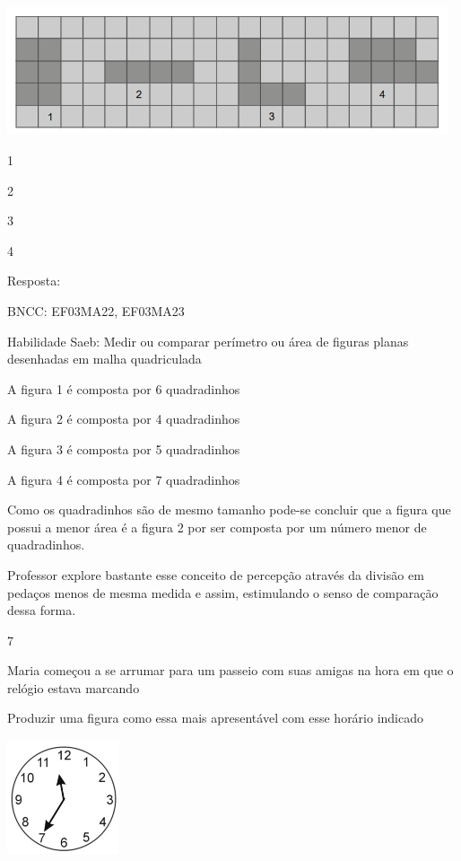 \begin{escolha}
\begin{escolha}
\includegraphics[width=5.12179in,height=1.48342in]{media/image133.png}

\begin{escolha}

\item
  1
\item
  2
\item
  3
\item
  4
\end{escolha}

Resposta:

BNCC: EF03MA22, EF03MA23

Habilidade Saeb: Medir ou comparar perímetro ou área de figuras planas
desenhadas em malha quadriculada

A figura 1 é composta por 6 quadradinhos

A figura 2 é composta por 4 quadradinhos

A figura 3 é composta por 5 quadradinhos

A figura 4 é composta por 7 quadradinhos

Como os quadradinhos são de mesmo tamanho pode-se concluir que a figura
que possui a menor área é a figura 2 por ser composta por um número
menor de quadradinhos.

Professor explore bastante esse conceito de percepção através da divisão
em pedaços menos de mesma medida e assim, estimulando o senso de
comparação dessa forma.

\num{7}

Maria começou a se arrumar para um passeio com suas amigas na hora em
que o relógio estava marcando

Produzir uma figura como essa mais apresentável com esse horário
indicado

\includegraphics[width=1.29487in,height=1.32633in]{media/image134.png}


\end{escolha}
\end{escolha}
